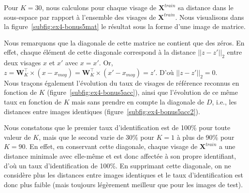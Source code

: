 \documentclass[a4paper]{article}
\newcommand{\figref}[1]{figure~\ref{#1}}
\begin{document}
Pour $K=30$, nous calculons pour chaque visage de $\mathbf{X}^{train}$ sa
distance dans le sous-espace par rapport à l’ensemble des visages de
$\mathbf{X}^{train}$. Nous visualisons dans la \figref{subfig:ex4-bonus5mat} le
résultat sous la forme d'une image de matrice. 

Nous remarquons que la diagonale de cette matrice ne contient que des zéros. En
effet, chaque élément de cette diagonale correspond à la distance $||\mathit{z}
- \mathit{z}'||_2$ entre deux visages $x$ et $x'$ avec $x = x'$. Or, $\mathit{z}
= \mathbf{W}^{\top}_K \times (\mathit{x} - \mathit{x}_{moy}) =
\mathbf{W}^{\top}_K \times (\mathit{x'} - \mathit{x}_{moy}) = \mathit{z'}$. D'où
$||\mathit{z} - \mathit{z}'||_2 = 0$.\\

Nous traçons également l'évolution du taux de visages de référence reconnus en
fonction de $K$ (\figref{subfig:ex4-bonus5acc}), ainsi que l'évolution de ce
même taux en fonction de $K$ mais sans prendre en compte la diagonale de $D$,
i.e., les distances entre images identiques (\figref{subfig:ex4-bonus5acc2}).

Nous constatons que le premier taux d'identification est de 100\% pour toute
valeur de $K$, mais que le second varie de 30\% pour $K=1$ à plus de 90\% pour
$K=90$. En effet, en conservant cette diagonale, chaque visage de
$\mathbf{X}^{train}$ a une distance minimale avec elle-même et est donc affectée
à son propre identifiant, d'où un taux d'identification de 100\%. En supprimant
cette diagonale, on ne considère plus les distances entre images identiques et
le taux d'identification est donc plus faible (mais toujours légèrement meilleur
que pour les images de test).\\
\end{document}

